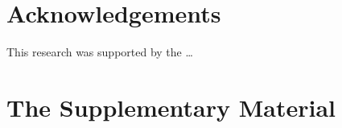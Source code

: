 \documentclass[3p, a4paper, 11pt]{elsarticle}
\begin{document}
\section*{Acknowledgements}
\noindent This research was supported by the \dots
\appendix
\setcounter{figure}{0}


\section{The Supplementary Material}\label{sec:app-A}



\end{document}
